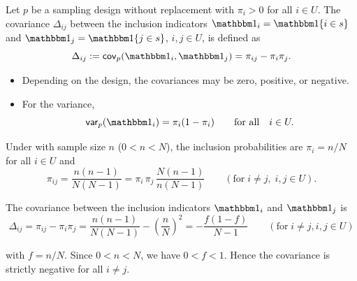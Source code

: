 \documentclass{my_eth_beamer}
\numberwithin{equation}{section}
\begin{document}
\begin{frame}
    \begin{Def}[Covariance]\label{def:var_cov_indicator}
        \vspace{-0.5em}
        Let $p$ be a sampling design without replacement with $\pi_i>0$ for all
        $i\in U$. The \alert{covariance} $\Delta_{ij}$ between the inclusion
        indicators $\indicator_i=\indicator\{i\in s\}$ and
        $\indicator_j=\indicator\{j\in s\}$, $i,j\in U$, is defined as
        \begin{equation*}
            \Delta_{ij} := \cov(\indicator_i, \indicator_j) = \pi_{ij} -
            \pi_i\pi_j.
        \end{equation*}
    \end{Def}
    \vspace{0.25em}
    \begin{itemize}
    \setlength{\itemsep}{12pt}
        \item Depending on the design, the covariances may be \alert{zero},
            \alert{positive}, or \alert{negative}.
        \item For the variance,
            \begin{equation*}
                \var(\indicator_i) = \pi_i(1-\pi_i) \qquad \text{for all}
                \quad i\in U.
            \end{equation*}
    \end{itemize}
\end{frame}

\begin{frame}
    \begin{Bsp}[\SRS]
        Under \SRS with sample size $n$ ($0<n<N$), the inclusion probabilities
        are $\pi_i=n/N$ for all $i\in U$ and
        \begin{equation*}
            \pi_{ij} = \frac{n(n - 1)}{N (N - 1)} = \pi_i \, \pi_j \, \frac{N(n
            - 1)}{n(N - 1)} \qquad (\text{for} \;
                i \neq j, \; i, j \in U).
        \end{equation*}

        \vspace{0.25em}

        The \alert{covariance} between the inclusion indicators $\indicator_i$
        and $\indicator_j$ is
        \begin{equation*}
            \Delta_{ij} = \pi_{ij} - \pi_i\pi_j
                = \frac{n(n - 1)}{N (N - 1)} - \left(\frac{n}{N}\right)^2
                = -\frac{f(1 - f)}{N - 1} \qquad (\text{for} \; i \neq j,
                i,j \in U)
        \end{equation*}

        \vspace{0.25em}

        \noindent with $f=n/N$. Since $0<n<N$, we have $0<f<1$. Hence the
        covariance is strictly \alert{negative} for all $i\neq j$.
    \end{Bsp}
\end{frame}
\end{document}
